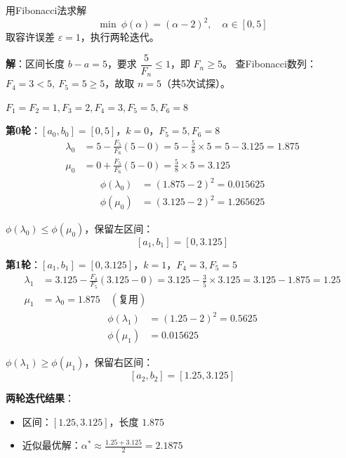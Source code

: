 \begin{example}\label{ex:fibonacci}
用Fibonacci法求解
\[
\min\ \phi(\alpha) = (\alpha - 2)^2,\quad \alpha \in [0, 5]
\]
取容许误差 $\varepsilon = 1$，执行两轮迭代。

\textbf{解}：区间长度 $b-a = 5$，要求 $\dfrac{5}{F_n} \leq 1$，即 $F_n \geq 5$。
查Fibonacci数列：$F_4=3 < 5,\ F_5=5 \geq 5$，故取 $n = 5$（共5次试探）。

$F_1=F_2=1, F_3=2, F_4=3, F_5=5, F_6=8$

\textbf{第0轮}：$[a_0, b_0] = [0, 5]$，$k=0$，$F_{5}=5, F_{6}=8$
\begin{align*}
\lambda_0 &= 5 - \frac{F_5}{F_6}(5-0) = 5 - \frac{5}{8} \times 5 = 5 - 3.125 = 1.875 \\
\mu_0 &= 0 + \frac{F_5}{F_6}(5-0) = \frac{5}{8} \times 5 = 3.125
\end{align*}
\begin{align*}
\phi(\lambda_0) &= (1.875 - 2)^2 = 0.015625 \\
\phi(\mu_0) &= (3.125 - 2)^2 = 1.265625
\end{align*}

$\phi(\lambda_0) \leq \phi(\mu_0)$，保留左区间：
\[
[a_1, b_1] = [0, 3.125]
\]

\textbf{第1轮}：$[a_1, b_1] = [0, 3.125]$，$k=1$，$F_{4}=3, F_{5}=5$
\begin{align*}
\lambda_1 &= 3.125 - \frac{F_4}{F_5}(3.125-0) = 3.125 - \frac{3}{5} \times 3.125 = 3.125 - 1.875 = 1.25 \\
\mu_1 &= \lambda_0 = 1.875 \quad (\text{复用})
\end{align*}
\begin{align*}
\phi(\lambda_1) &= (1.25 - 2)^2 = 0.5625 \\
\phi(\mu_1) &= 0.015625
\end{align*}

$\phi(\lambda_1) \geq \phi(\mu_1)$，保留右区间：
\[
[a_2, b_2] = [1.25, 3.125]
\]

\textbf{两轮迭代结果}：
\begin{itemize}
    \item 区间：$[1.25, 3.125]$，长度 $1.875$
    \item 近似最优解：$\alpha^* \approx \frac{1.25 + 3.125}{2} = 2.1875$
\end{itemize}
\end{example}

